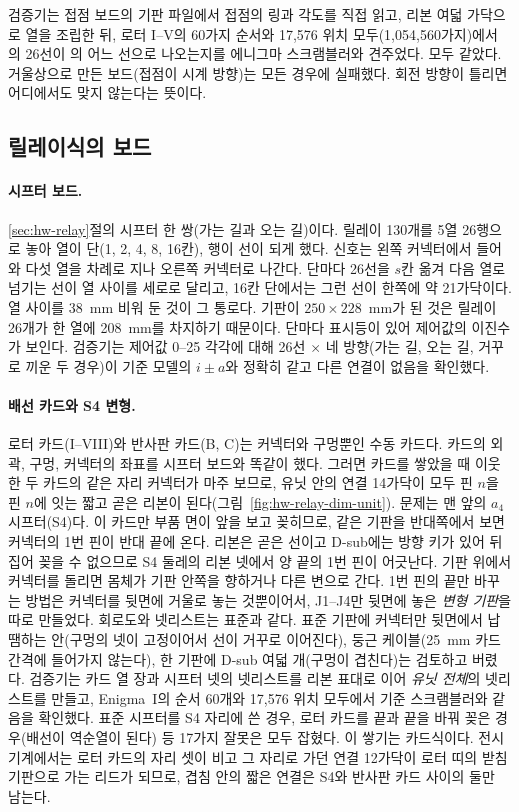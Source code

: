 검증기는 접점 보드의 기판 파일에서 접점의 링과 각도를 직접 읽고, 리본 여덟 가닥으로 열을 조립한 뒤, 로터 I--V의 60가지
순서와 17,576 위치 모두(1,054,560가지)에서 의 26선이 의 어느 선으로 나오는지를 에니그마 스크램블러와
견주었다. 모두 같았다. 거울상으로 만든 보드(접점이 시계 방향)는 모든 경우에 실패했다. 회전 방향이 틀리면 어디에서도
맞지 않는다는 뜻이다.

\subsection{릴레이식의 보드}\label{sec:hw-boards-relay}

\paragraph{시프터 보드.} \ref{sec:hw-relay}절의 시프터 한 쌍(가는 길과 오는 길)이다. 릴레이 130개를 5열 26행으로 놓아
열이 단(1, 2, 4, 8, 16칸), 행이 선이 되게 했다. 신호는 왼쪽 커넥터에서 들어와 다섯 열을 차례로 지나 오른쪽 커넥터로
나간다. 단마다 26선을 $s$칸 옮겨 다음 열로 넘기는 선이 열 사이를 세로로 달리고, 16칸 단에서는 그런 선이 한쪽에 약 21가닥이다.
열 사이를 38~mm 비워 둔 것이 그 통로다. 기판이 $250 \times 228$~mm가 된 것은 릴레이 26개가 한 열에 208~mm를 차지하기
때문이다. 단마다 표시등이 있어 제어값의 이진수가 보인다. 검증기는 제어값 0--25 각각에 대해 26선 $\times$ 네 방향(가는 길,
오는 길, 거꾸로 끼운 두 경우)이 기준 모델의 $i \pm a$와 정확히 같고 다른 연결이 없음을 확인했다.

\paragraph{배선 카드와 S4 변형.} 로터 카드(I--VIII)와 반사판 카드(B, C)는 커넥터와 구멍뿐인 수동 카드다. 카드의 외곽, 구멍,
커넥터의 좌표를 시프터 보드와 똑같이 했다. 그러면 카드를 쌓았을 때 이웃한 두 카드의 같은 자리 커넥터가 마주 보므로, 유닛
안의 연결 14가닥이 모두 핀 $n$을 핀 $n$에 잇는 짧고 곧은 리본이 된다(그림~\ref{fig:hw-relay-dim-unit}). 문제는 맨 앞의
$a_4$ 시프터(S4)다. 이 카드만 부품 면이 앞을 보고 꽂히므로, 같은 기판을 반대쪽에서 보면 커넥터의 1번 핀이 반대 끝에 온다.
리본은 곧은 선이고 D-sub에는 방향 키가 있어 뒤집어 꽂을 수 없으므로 S4 둘레의 리본 넷에서 양 끝의 1번 핀이 어긋난다.
기판 위에서 커넥터를 돌리면 몸체가 기판 안쪽을 향하거나 다른 변으로 간다. 1번 핀의 끝만 바꾸는 방법은 커넥터를 뒷면에
거울로 놓는 것뿐이어서, J1--J4만 뒷면에 놓은 \emph{변형 기판}을 따로 만들었다. 회로도와 넷리스트는 표준과 같다. 표준
기판에 커넥터만 뒷면에서 납땜하는 안(구멍의 넷이 고정이어서 선이 거꾸로 이어진다), 둥근 케이블(25~mm 카드 간격에 들어가지
않는다), 한 기판에 D-sub 여덟 개(구멍이 겹친다)는 검토하고 버렸다. 검증기는 카드 열 장과 시프터 넷의 넷리스트를 리본
표대로 이어 \emph{유닛 전체}의 넷리스트를 만들고, Enigma~I의 순서 60개와 17,576 위치 모두에서 기준 스크램블러와 같음을
확인했다. 표준 시프터를 S4 자리에 쓴 경우, 로터 카드를 끝과 끝을 바꿔 꽂은 경우(배선이 역순열이 된다) 등 17가지 잘못은
모두 잡혔다. 이 쌓기는 카드식이다. 전시 기계에서는 로터 카드의 자리 셋이 비고 그 자리로 가던 연결 12가닥이 로터 띠의
받침 기판으로 가는 리드가 되므로, 겹침 안의 짧은 연결은 S4와 반사판 카드 사이의 둘만 남는다.

